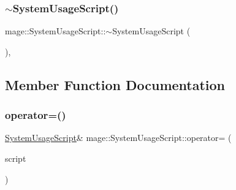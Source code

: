\hypertarget{classmage_1_1_system_usage_script_ac4c71b831e5cd5d6a5db8783150b76cc}{}\label{classmage_1_1_system_usage_script_ac4c71b831e5cd5d6a5db8783150b76cc} 
\subsubsection{\texorpdfstring{$\sim$\+System\+Usage\+Script()}{~SystemUsageScript()}}
{\footnotesize\ttfamily mage\+::\+System\+Usage\+Script\+::$\sim$\+System\+Usage\+Script (\begin{DoxyParamCaption}{ }\end{DoxyParamCaption})\hspace{0.3cm}{\ttfamily [virtual]}, {\ttfamily [default]}}



\subsection{Member Function Documentation}
\hypertarget{classmage_1_1_system_usage_script_a3ca814599a30991f3e6068cec2b876df}{}\label{classmage_1_1_system_usage_script_a3ca814599a30991f3e6068cec2b876df} 
\subsubsection{\texorpdfstring{operator=()}{operator=()}\hspace{0.1cm}{\footnotesize\ttfamily [1/2]}}
{\footnotesize\ttfamily \hyperlink{classmage_1_1_system_usage_script}{System\+Usage\+Script}\& mage\+::\+System\+Usage\+Script\+::operator= (\begin{DoxyParamCaption}\item[{const \hyperlink{classmage_1_1_system_usage_script}{System\+Usage\+Script} \&}]{script }\end{DoxyParamCaption})\hspace{0.3cm}{\ttfamily [delete]}}

\hypertarget{classmage_1_1_system_usage_script_ad9c1a2f19c6d79adbd32789e479e1427}{}\label{classmage_1_1_system_usage_script_ad9c1a2f19c6d79adbd32789e479e1427} 
